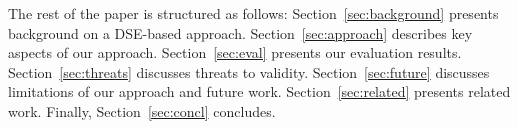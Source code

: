 The rest of the paper is structured as follows:
Section~\ref{sec:background} presents background on a DSE-based approach.
Section~\ref{sec:approach} describes key aspects of our approach.
Section~\ref{sec:eval} presents our evaluation results.
Section~\ref{sec:threats} discusses threats to validity.
Section~\ref{sec:future} discusses limitations of our approach and future work.
Section~\ref{sec:related} presents related work.
Finally, Section~\ref{sec:concl} concludes. 





